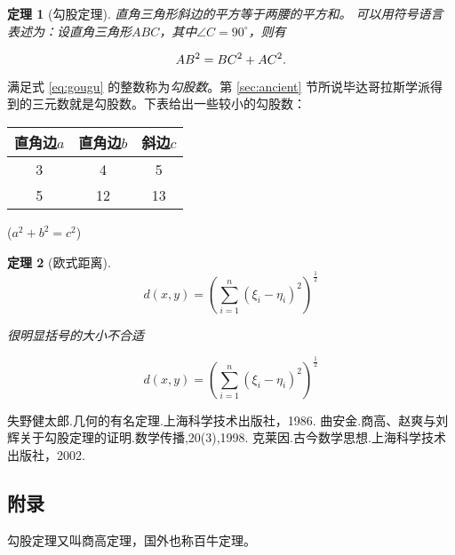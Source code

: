 \documentclass{article}  %
\newtheorem{thm}{定理}
\newcommand\degree{^\circ}
\begin{document}
	\begin{thm}[\small 勾股定理]  %
	\small 直角三角形斜边的平方等于两腰的平方和。\small
	 可以用符号语言表述为：设直角三角形$ABC$，其中$\angle C=90\degree$，则有
	 
	\begin{equation}\label{eq:gougu}  %
	\small AB^2=BC^2+AC^2.
		\end{equation}
	
	\end{thm}
	
	\small 满足式 \eqref{eq:gougu} 的整数称为\emph{勾股数}。第 \ref{sec:ancient} 节所说毕达哥拉斯学派得到的三元数就是勾股数。下表给出一些较小的勾股数：
	
	\vspace{3mm}  %
	
	\begin{tabular}{|c|c|c|}\hline   %
			
		\small 直角边$a$&直角边$b$&斜边$c$\\\hline   %
		3&4&5\\\hline
		5&12&13\\\hline
	\end{tabular}

	\small ($a^2+b^2=c^2$)
	
	
	\begin{thm}[欧式距离]   %
		
		$$d(x,y)=(\sum\limits_{i=1}^n(\xi_i-\eta_i)^2)^\frac{1}{2}$$
		
		
		\begin{center}
		很明显括号的大小不合适
		\end{center}
	
		$$d(x,y)=\left(\sum\limits_{i=1}^n(\xi_i-\eta_i)^2\right)^\frac{1}{2}$$
	\end{thm}
	
	
	\begin{thebibliography}{99}    %
		失野健太郎.几何的有名定理.上海科学技术出版社，1986.      
		曲安金.商高、赵爽与刘辉关于勾股定理的证明.数学传播,20(3),1998.  
		克莱因.古今数学思想.上海科学技术出版社，2002.
	\end{thebibliography}

	
	\begin{appendix}
		\section{附录}
		\small 勾股定理又叫商高定理，国外也称百牛定理。
	\end{appendix}
	
\end{document}
